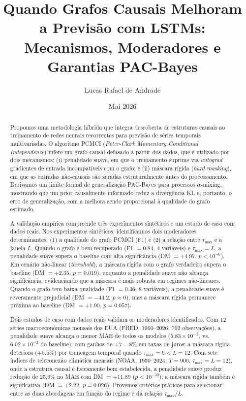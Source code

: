 \documentclass[12pt, a4paper]{article}
\begin{document}
\title{Quando Grafos Causais Melhoram a Previsão com LSTMs: Mecanismos, Moderadores e Garantias PAC-Bayes}
\author{Lucas Rafael de Andrade} 
\date{Mai 2026}  
\maketitle

\begin{abstract}
Propomos uma metodologia híbrida que integra descoberta de estruturas causais ao treinamento de redes neurais recorrentes para previsão de séries temporais multivariadas. O algoritmo PCMCI (\emph{Peter-Clark Momentary Conditional Independence}) infere um grafo causal defasado a partir dos dados, que é utilizado por dois mecanismos: (i) penalidade suave, em que o treinamento suprime via \emph{autograd} gradientes de entrada incompatíveis com o grafo; e (ii) máscara rígida (\emph{hard masking}), em que as entradas não-causais são zeradas estruturalmente antes do processamento. Derivamos um limite formal de generalização PAC-Bayes para processos $\alpha$-mixing, mostrando que um prior causalmente informado reduz a divergência KL e, portanto, o erro de generalização, com a melhora sendo proporcional à qualidade do grafo estimado.

A validação empírica compreende três experimentos sintéticos e um estudo de caso com dados reais. Nos experimentos sintéticos, identificamos dois moderadores determinantes: (1) a qualidade do grafo PCMCI (F1) e (2) a relação entre $\tau_{\max}$ e a janela $L$. Quando o grafo é bem recuperado (F1 $= 0.84$, 4 variáveis) e $\tau_{\max} = L$, a penalidade suave supera o baseline com alta significância (DM $= +4.97$, $p < 10^{-6}$). Em cenário não-linear (\emph{threshold}), a máscara rígida com o grafo verdadeiro supera o baseline (DM $= +2.35$, $p = 0.019$), enquanto a penalidade suave não alcança significância, evidenciando que a máscara é mais robusta em regimes não-lineares. Quando o grafo tem baixa qualidade (F1 $= 0.36$, 8 variáveis), a penalidade suave é severamente prejudicial (DM $= -44.2$, $p \approx 0$), mas a máscara rígida permanece próxima ao baseline (DM $= +1.90$, $p = 0.057$).

Dois estudos de caso com dados reais validam os moderadores identificados. Com 12 séries macroeconômicas mensais dos EUA (FRED, 1960--2026, 792 observações), a penalidade suave alcança o menor MAE de todos os modelos ($5.83 \times 10^{-2}$, vs.\ $6.02 \times 10^{-2}$ do baseline), com ganhos de $+7{-}8\%$ em taxas de juros; a máscara rígida deteriora ($+5.5\%$) por truncagem temporal quando $\tau_{\max} = 6 < L = 12$. Com sete índices de teleconexão climática mensais (NOAA, 1950--2024, $T = 900$, $\tau_{\max} = L = 12$), onde a estrutura causal é fisicamente bem estabelecida, a penalidade suave produz redução de 25{,}6\% no MAE com DM $= +11.89$ ($p < 10^{-30}$); a máscara rígida também é significativa (DM $= +2.22$, $p = 0.026$). Provemos critérios práticos para selecionar entre as duas abordagens em função do regime e da relação $\tau_{\max}/L$.
\end{abstract}
\end{document}
